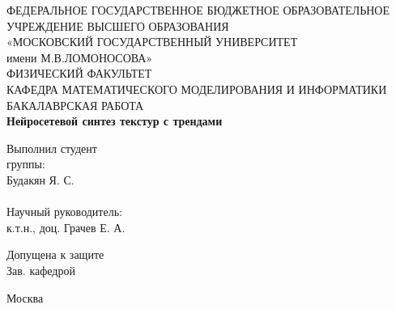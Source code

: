 \documentclass[a4paper]{article}
\begin{document}
	
	\begin{center}
		\footnotesize{ФЕДЕРАЛЬНОЕ ГОСУДАРСТВЕННОЕ БЮДЖЕТНОЕ ОБРАЗОВАТЕЛЬНОЕ }\\ 
		\footnotesize{УЧРЕЖДЕНИЕ ВЫСШЕГО ОБРАЗОВАНИЯ}\\
		\small{«МОСКОВСКИЙ ГОСУДАРСТВЕННЫЙ УНИВЕРСИТЕТ}\\
		\small{имени М.В.ЛОМОНОСОВА»}\\
		\hfill \break
		\normalsize{ФИЗИЧЕСКИЙ ФАКУЛЬТЕТ}\\
		\hfill \break
		\normalsize{КАФЕДРА МАТЕМАТИЧЕСКОГО МОДЕЛИРОВАНИЯ И ИНФОРМАТИКИ}\\
		\hfill \break
		\hfill \break
		\hfill \break
		\hfill \break
		\hfill \break
		\normalsize{БАКАЛАВРСКАЯ РАБОТА}\\
		\hfill \break
		\large{\textbf{Нейросетевой синтез текстур с трендами}}\\
	\end{center}
	
	\hfill \break

	\begin{flushright}
		Выполнил студент \\
		\hfill {} группы:\\
		\hfill \break
		Будакян Я. С.\\
		\hfill \break
		\underline{\hspace{3cm}}\\
		\hfill \break
		\hfill \break
		Научный руководитель: \\
		\hfill \break
		к.т.н., доц. Грачев Е. А.\\
		\hfill \break
		\underline{\hspace{3cm}}
	\end{flushright}
	
	\hfill \break
	\hfill \break
	\hfill \break
	
	Допущена к защите\\
	
	Зав. кафедрой \underline{\hspace{3cm}}\\
	
	\hfill \break
	\hfill \break
	\hfill \break
	
	\begin{center}
		Москва \\
		\hfill {} 
	\end{center}
	
	\thispagestyle{empty} %
	
\end{document}
